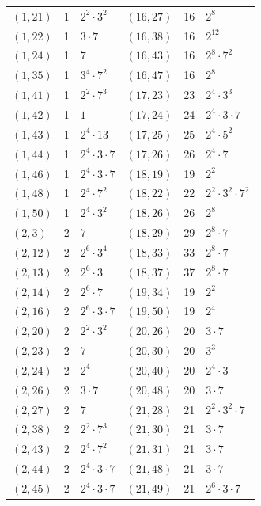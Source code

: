 \documentclass[11pt]{article}
\begin{document}
\begin{longtable}{@{}lrl@{\qquad}lrl@{}}
$(1,21)$ & 1 & $2^{2}\cdot 3^{2}$ & $(16,27)$ & 16 & $2^{8}$\\
$(1,22)$ & 1 & $3\cdot 7$ & $(16,38)$ & 16 & $2^{12}$\\
$(1,24)$ & 1 & $7$ & $(16,43)$ & 16 & $2^{8}\cdot 7^{2}$\\
$(1,35)$ & 1 & $3^{4}\cdot 7^{2}$ & $(16,47)$ & 16 & $2^{8}$\\
$(1,41)$ & 1 & $2^{2}\cdot 7^{3}$ & $(17,23)$ & 23 & $2^{4}\cdot 3^{3}$\\
$(1,42)$ & 1 & $1$ & $(17,24)$ & 24 & $2^{4}\cdot 3\cdot 7$\\
$(1,43)$ & 1 & $2^{4}\cdot 13$ & $(17,25)$ & 25 & $2^{4}\cdot 5^{2}$\\
$(1,44)$ & 1 & $2^{4}\cdot 3\cdot 7$ & $(17,26)$ & 26 & $2^{4}\cdot 7$\\
$(1,46)$ & 1 & $2^{4}\cdot 3\cdot 7$ & $(18,19)$ & 19 & $2^{2}$\\
$(1,48)$ & 1 & $2^{4}\cdot 7^{2}$ & $(18,22)$ & 22 & $2^{2}\cdot 3^{2}\cdot 7^{2}$\\
$(1,50)$ & 1 & $2^{4}\cdot 3^{2}$ & $(18,26)$ & 26 & $2^{8}$\\
$(2,3)$ & 2 & $7$ & $(18,29)$ & 29 & $2^{8}\cdot 7$\\
$(2,12)$ & 2 & $2^{6}\cdot 3^{4}$ & $(18,33)$ & 33 & $2^{8}\cdot 7$\\
$(2,13)$ & 2 & $2^{6}\cdot 3$ & $(18,37)$ & 37 & $2^{8}\cdot 7$\\
$(2,14)$ & 2 & $2^{6}\cdot 7$ & $(19,34)$ & 19 & $2^{2}$\\
$(2,16)$ & 2 & $2^{6}\cdot 3\cdot 7$ & $(19,50)$ & 19 & $2^{4}$\\
$(2,20)$ & 2 & $2^{2}\cdot 3^{2}$ & $(20,26)$ & 20 & $3\cdot 7$\\
$(2,23)$ & 2 & $7$ & $(20,30)$ & 20 & $3^{3}$\\
$(2,24)$ & 2 & $2^{4}$ & $(20,40)$ & 20 & $2^{4}\cdot 3$\\
$(2,26)$ & 2 & $3\cdot 7$ & $(20,48)$ & 20 & $3\cdot 7$\\
$(2,27)$ & 2 & $7$ & $(21,28)$ & 21 & $2^{2}\cdot 3^{2}\cdot 7$\\
$(2,38)$ & 2 & $2^{2}\cdot 7^{3}$ & $(21,30)$ & 21 & $3\cdot 7$\\
$(2,43)$ & 2 & $2^{4}\cdot 7^{2}$ & $(21,31)$ & 21 & $3\cdot 7$\\
$(2,44)$ & 2 & $2^{4}\cdot 3\cdot 7$ & $(21,48)$ & 21 & $3\cdot 7$\\
$(2,45)$ & 2 & $2^{4}\cdot 3\cdot 7$ & $(21,49)$ & 21 & $2^{6}\cdot 3\cdot 7$\\

\end{longtable}
\end{document}
